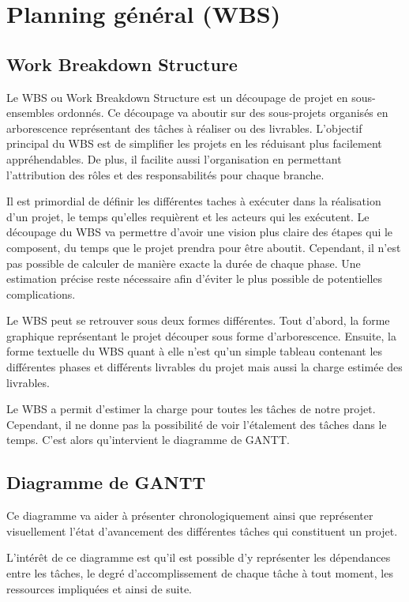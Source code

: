 \chapter{Planning général  (WBS)}

\section{Work Breakdown Structure}
Le WBS ou Work Breakdown Structure est un découpage de projet en sous-ensembles ordonnés. Ce découpage va aboutir sur des sous-projets organisés en arborescence représentant des tâches à réaliser ou des livrables. L’objectif principal du WBS est de simplifier les projets en les réduisant plus facilement appréhendables. De plus, il facilite aussi l’organisation en permettant l’attribution des rôles et des responsabilités pour chaque branche. 

 

Il est primordial de définir les différentes taches à exécuter dans la réalisation d’un projet, le temps qu’elles requièrent et les acteurs qui les exécutent. Le découpage du WBS va permettre d’avoir une vision plus claire des étapes qui le composent, du temps que le projet prendra pour être aboutit. Cependant, il n’est pas possible de calculer de manière exacte la durée de chaque phase. Une estimation précise reste nécessaire afin d’éviter le plus possible de potentielles complications. 

Le WBS peut se retrouver sous deux formes différentes. Tout d’abord, la forme graphique représentant le projet découper sous forme d’arborescence. Ensuite, la forme textuelle du WBS quant à elle n’est qu’un simple tableau contenant les différentes phases et différents livrables du projet mais aussi la charge estimée des livrables. 
\begin{table}[H]

\end{table}


Le WBS a permit d’estimer la charge pour toutes les tâches de notre projet. Cependant, il ne donne pas la possibilité de voir l’étalement des tâches dans le temps. C’est alors qu’intervient le diagramme de GANTT. 

\section{Diagramme de GANTT}
Ce diagramme va aider à présenter chronologiquement ainsi que représenter visuellement l'état d'avancement des différentes tâches qui constituent un projet. 

 

L'intérêt de ce diagramme est qu'il est possible d'y représenter les dépendances entre les tâches, le degré d'accomplissement de chaque tâche à tout moment, les ressources impliquées et ainsi de suite. 